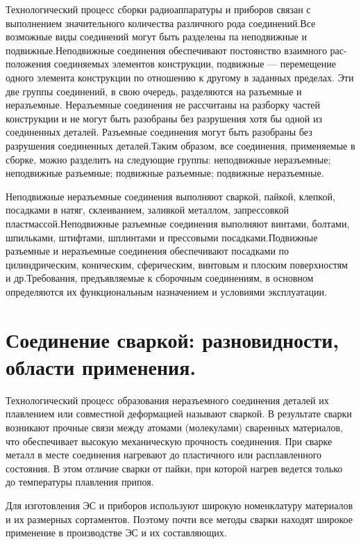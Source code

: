 \documentclass[unicode, 12pt, a4paper, oneside]{article}
\begin{document}
Технологический процесс сборки радиоаппаратуры и приборов связан с выполнением значительного количества различного рода соединений.Все возможные виды соединений могут быть разделены па неподвижные и подвижные.Неподвижные соединения обеспечивают постоянство взаимного рас-положения соединяемых элементов конструкции, подвижные — перемещение одного элемента конструкции по отношению к другому в заданных пределах. Эти две группы соединений, в свою очередь, разделяются на разъемные и неразъемные. Неразъемные соединения не рассчитаны на разборку частей конструкции и не могут быть разобраны без разрушения хотя бы одной из соединенных деталей. Разъемные соединения могут быть разобраны без разрушения соединенных  деталей.Таким образом, все соединения, применяемые в сборке, можно разделить на следующие группы: неподвижные неразъемные; неподвижные разъемные; подвижные разъемные; подвижные неразъемные.

Неподвижные неразъемные соединения выполняют сваркой, пайкой, клепкой, посадками в натяг, склеиванием, заливкой металлом, запрессовкой пластмассой.Неподвижные разъемные соединения выполняют винтами, болтами, шпильками, штифтами, шплинтами и прессовыми  посадками.Подвижные разъемные и неразъемные соединения обеспечивают посадками по цилиндрическим, коническим, сферическим, винтовым и плоским поверхностям и др.Требования, предъявляемые к сборочным соединениям, в основном определяются их функциональным назначением и условиями эксплуатации.


\section{Соединение сваркой: разновидности, области применения.}

Технологический процесс образования неразъемного соединения деталей их плавлением или совместной деформацией называют сваркой. В результате сварки возникают прочные связи между атомами (молекулами) сваренных материалов, что обеспечивает высокую механическую прочность соединения. При сварке металл в месте соединения нагревают до пластичного или расплавленного состояния. В этом отличие сварки от пайки, при которой нагрев ведется только до температуры плавления припоя.

Для изготовления ЭС и приборов используют широкую номенклатуру материалов и их размерных сортаментов. Поэтому почти все методы сварки находят широкое применение в производстве ЭС и их составляющих.
\end{document}
